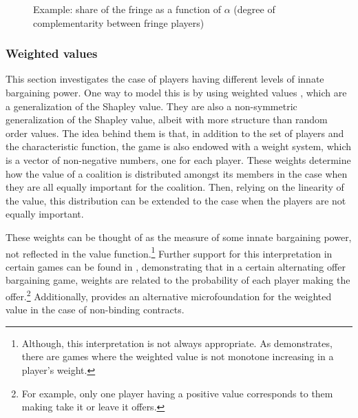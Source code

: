 \documentclass[a4paper]{article}
\begin{document}
\begin{figure}
    \centering
    \caption{Example: share of the fringe as a function of $\alpha$ (degree of complementarity between fringe players)}
    \label{fig:power_function_example}
\end{figure}


\subsubsection{Weighted values}
\label{sec:weighted_one_sided}

This section investigates the case of players having different levels of innate bargaining power.
One way to model this is by using weighted values \parencite{shapley1953additive}, which are a generalization of the Shapley value.
They are also a non-symmetric generalization of the Shapley value, albeit with more structure than random order values.
The idea behind them is that, in addition to the set of players and the characteristic function, the game is also endowed with a weight system, which is a vector of non-negative numbers, one for each player.
These weights determine how the value of a coalition is distributed amongst its members in the case when they are all equally important for the coalition.
Then, relying on the linearity of the value, this distribution can be extended to the case when the players are not equally important.

These weights can be thought of as the measure of some innate bargaining power, not reflected in the value function.\footnote{
    Although, this interpretation is not always appropriate.
    As \textcite{owen1968communications} demonstrates, there are games where the weighted value is not monotone increasing in a player's weight.
}
Further support for this interpretation in certain games can be found in \textcite{hart1996bargaining}, demonstrating that in a certain alternating offer bargaining game, weights are related to the probability of each player making the offer.\footnote{
    For example, only one player having a positive value corresponds to them making take it or leave it offers.
}
Additionally, \textcite{stole1996intra} provides an alternative microfoundation for the weighted value in the case of non-binding contracts.
\end{document}

